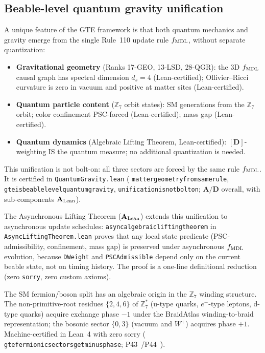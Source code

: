 \documentclass[11pt]{article}
\theoremstyle{remark}
\newcommand{\ZS}{\mathbb{Z}_7}
\newcommand{\lean}[1]{%
  \penalty-100
  \begingroup\def\_{\textunderscore\allowbreak}\texttt{#1}\endgroup}
\newcommand{\fmdl}{f_{\rm MDL}}
\newcommand{\CatAL}{\ensuremath{\textbf{A}_{\rm Lean}}}
\newcommand{\CatAD}{\textbf{A/D}}
\begin{document}
\subsection{Beable-level quantum gravity unification}
\label{ssec:qgr_unification}

A unique feature of the GTE framework is that both quantum mechanics and gravity
emerge from the single Rule~110 update rule $\fmdl$, without separate quantization:
\begin{itemize}[leftmargin=2em,itemsep=2pt]
\item \textbf{Gravitational geometry} (Ranks 17-GEO, 13-LSD, 28-QGR):
  the $3$D $\fmdl$ causal graph has spectral dimension $d_s = 4$ (Lean-certified);
  Ollivier--Ricci curvature is zero in vacuum and positive at matter sites (Lean-certified).
\item \textbf{Quantum particle content} ($\ZS$ orbit states):
  SM generations from the $\ZS$ orbit; color confinement PSC-forced (Lean-certified);
  mass gap (Lean-certified).
\item \textbf{Quantum dynamics} (Algebraic Lifting Theorem, Lean-certified):
  $[\mathbf{D}]$-weighting IS the quantum measure; no additional quantization is needed.
\end{itemize}
This unification is not bolt-on: all three sectors are forced by the same rule $\fmdl$.
It is certified in \lean{QuantumGravity.lean}
(\lean{matter\_geometry\_from\_same\_rule},
\lean{gte\_is\_beable\_level\_quantum\_gravity},
\lean{unification\_is\_not\_bolt\_on}; $\CatAD$ overall, with sub-components $\CatAL$).

The Asynchronous Lifting Theorem ($\CatAL$) extends this unification
to asynchronous update schedules:
\lean{async\_algebraic\_lifting\_theorem} in \lean{AsyncLiftingTheorem.lean}
proves that any local state predicate (PSC-admissibility, confinement, mass gap)
is preserved under asynchronous $\fmdl$ evolution, because \texttt{DWeight} and
\texttt{PSCAdmissible} depend only on the current beable state, not on timing history.
The proof is a one-line definitional reduction (zero \texttt{sorry}, zero custom axioms).

The SM fermion/boson split has an algebraic origin in the $\ZS$ winding structure. The non-primitive-root residues $\{2, 4, 6\}$ of $\ZS^*$ (u-type quarks, $e^-$-type leptons, d-type quarks) acquire exchange phase $-1$ under the BraidAtlas winding-to-braid representation; the bosonic sector $\{0, 3\}$ (vacuum and $W^+$) acquires phase $+1$. Machine-certified in Lean~4 with zero sorry (\lean{gte\_fermionic\_sectors\_get\_minus\_phase}; P43~\cite{SpivackCompleteness}/P44~\cite{SpivackQGR}).
\end{document}
